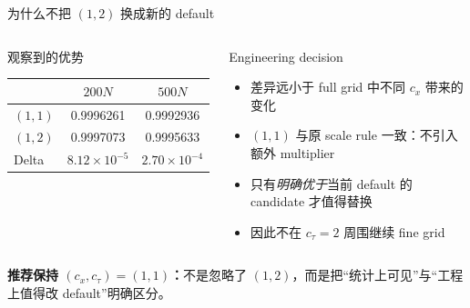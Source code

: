 \documentclass[aspectratio=169,10pt]{beamer}
\newcommand{\good}[1]{\textcolor{BDSGreen}{\bfseries #1}}
\newcommand{\tight}{\setlength{\itemsep}{0.35em}\setlength{\parskip}{0pt}}
\begin{document}
\begin{frame}{为什么不把 $(1,2)$ 换成新的 default}
\small
\begin{columns}[T,onlytextwidth]
\begin{block}{观察到的优势}
\begin{tabular}{lcc}
\toprule
 & $200N$ & $500N$ \\
\midrule
$(1,1)$ & 0.9996261 & 0.9992936 \\
$(1,2)$ & 0.9997073 & 0.9995633 \\
Delta & $8.12\times10^{-5}$ & $2.70\times10^{-4}$ \\
\bottomrule
\end{tabular}
\end{block}

\begin{block}{Engineering decision}
\begin{itemize}\tight
  \item 差异远小于 full grid 中不同 $c_x$ 带来的变化
  \item $(1,1)$ 与原 scale rule 一致：不引入额外 multiplier
  \item 只有\emph{明确优于}当前 default 的 candidate 才值得替换
  \item 因此不在 $c_\tau=2$ 周围继续 fine grid
\end{itemize}
\end{block}
\end{columns}

\vfill
\centering
\colorbox{BDSLight}{\parbox{0.90\textwidth}{\centering
\good{推荐保持 $(c_x,c_\tau)=(1,1)$：}不是忽略了 $(1,2)$，而是把“统计上可见”与“工程上值得改 default”明确区分。}}
\end{frame}
\end{document}

